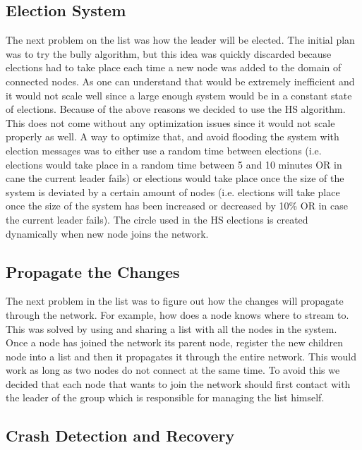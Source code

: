 \subsection{Election System}

The next problem on the list was how the leader will be elected. The initial plan was to try the bully algorithm, but this idea was quickly discarded because elections had to take place each time a new node was added to the domain of connected nodes. As one can understand that would be extremely inefficient and it would not scale well since a large enough system would be in a constant state of elections. Because of the above reasons we decided to use the HS algorithm. This does not come without any optimization issues since it would not scale properly as well. A way to optimize that, and avoid flooding the system with election messages was to either use a random time between elections (i.e. elections would take place in a random time between 5 and 10 minutes OR in cane the current leader fails) or elections would take place once the size of the system is deviated by a certain amount of nodes (i.e. elections will take place once the size of the system has been increased or decreased by 10\% OR in case the current leader fails). The circle used in the HS elections is created dynamically when  new node joins the network. \\

\subsection{Propagate the Changes}

The next problem in the list was to figure out how the changes will propagate through the network. For example, how does a node knows where to stream to. This was solved by using and sharing a list with all the nodes in the system. Once a node has joined the network its parent node, register the new children node into a list and then it propagates it through the entire network. This would work as long as two nodes do not connect at the same time. To avoid this we decided that each node that wants to join the network should first contact with the leader of the group which is responsible for managing the list himself. \\


\subsection{Crash Detection and Recovery}

